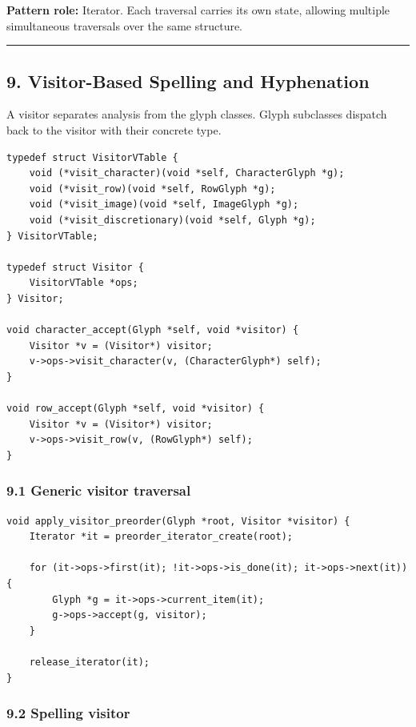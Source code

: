 \documentclass[11pt]{article}
\begin{document}
\textbf{Pattern role:} Iterator. Each traversal carries its own state, allowing multiple simultaneous traversals over the same structure.

\begin{center}\rule{0.5\linewidth}{0.5pt}\end{center}

\subsection{9. Visitor-Based Spelling and Hyphenation}\label{visitor-based-spelling-and-hyphenation}

A visitor separates analysis from the glyph classes. Glyph subclasses dispatch back to the visitor with their concrete type.

\begin{verbatim}
typedef struct VisitorVTable {
    void (*visit_character)(void *self, CharacterGlyph *g);
    void (*visit_row)(void *self, RowGlyph *g);
    void (*visit_image)(void *self, ImageGlyph *g);
    void (*visit_discretionary)(void *self, Glyph *g);
} VisitorVTable;

typedef struct Visitor {
    VisitorVTable *ops;
} Visitor;

void character_accept(Glyph *self, void *visitor) {
    Visitor *v = (Visitor*) visitor;
    v->ops->visit_character(v, (CharacterGlyph*) self);
}

void row_accept(Glyph *self, void *visitor) {
    Visitor *v = (Visitor*) visitor;
    v->ops->visit_row(v, (RowGlyph*) self);
}
\end{verbatim}

\subsubsection{9.1 Generic visitor traversal}\label{generic-visitor-traversal}

\begin{verbatim}
void apply_visitor_preorder(Glyph *root, Visitor *visitor) {
    Iterator *it = preorder_iterator_create(root);

    for (it->ops->first(it); !it->ops->is_done(it); it->ops->next(it)) {
        Glyph *g = it->ops->current_item(it);
        g->ops->accept(g, visitor);
    }

    release_iterator(it);
}
\end{verbatim}

\subsubsection{9.2 Spelling visitor}\label{spelling-visitor}
\end{document}

